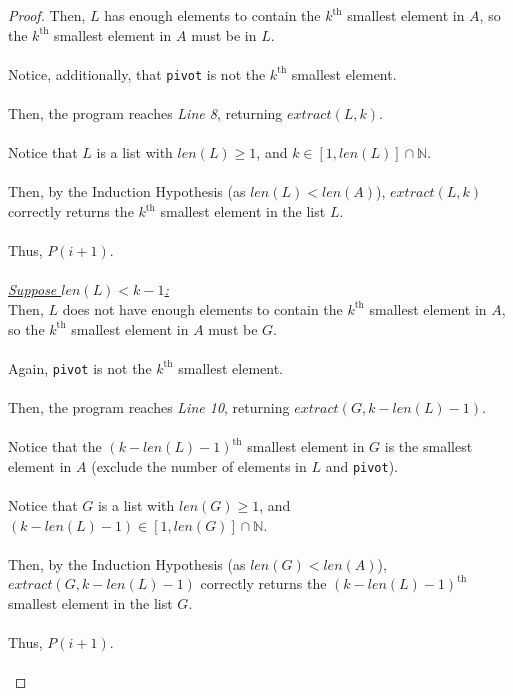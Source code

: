 \documentclass[12pt]{article}
\begin{document}
\begin{proof}
    Then, $L$ has enough elements to contain the $k^{\text{th}}$ smallest element in $A$, so the $k^{\text{th}}$ smallest element in $A$ must be in $L$. \\
    \\
    Notice, additionally, that \texttt{pivot} is not the $k^{\text{th}}$ smallest element. \\
    \\
    Then, the program reaches \textit{Line 8}, returning $extract(L, k)$. \\
    \\
    Notice that $L$ is a list with $len(L) \geq 1$, and $k \in [1, len(L)] \cap \mathbb{N}$. \\
    \\
    Then, by the Induction Hypothesis (as $len(L) < len(A)$), $extract(L, k)$ correctly returns the $k^{\text{th}}$ smallest element in the list $L$. \\
    \\
    Thus, $P(i + 1)$. \\
    \\
    \underline{\textit{Suppose $len(L) < k - 1$:}} \\
    Then, $L$ does not have enough elements to contain the $k^{\text{th}}$ smallest element in $A$, so the $k^{\text{th}}$ smallest element in $A$ must be $G$. \\
    \\
    Again, \texttt{pivot} is not the $k^{\text{th}}$ smallest element. \\
    \\
    Then, the program reaches \textit{Line 10}, returning $extract(G, k - len(L) - 1)$. \\
    \\
    Notice that the $(k - len(L) - 1)^{\text{th}}$ smallest element in $G$ is the smallest element in $A$ (exclude the number of elements in $L$ and \texttt{pivot}). \\
    \\
    Notice that $G$ is a list with $len(G) \geq 1$, and $(k - len(L) - 1) \in [1, len(G)] \cap \mathbb{N}$. \\
    \\
    Then, by the Induction Hypothesis (as $len(G) < len(A)$), $extract(G, k - len(L) - 1)$ correctly returns the $(k - len(L) - 1)^{\text{th}}$ smallest element in the list $G$. \\
    \\
    Thus, $P(i + 1)$. \\
    \\

\end{proof}
\end{document}
